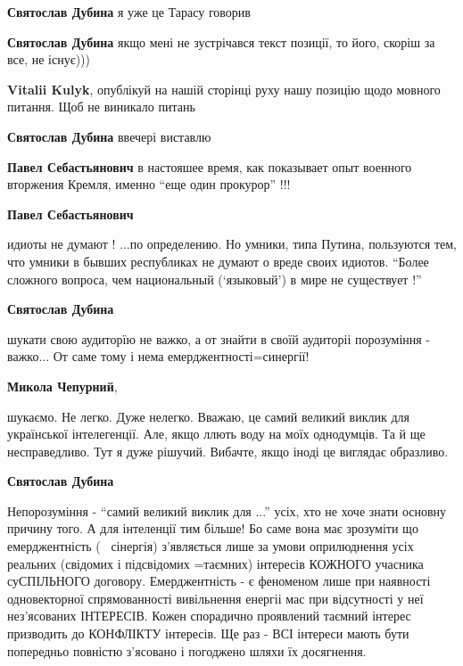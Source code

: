 \begin{itemize}
\begin{itemize}
\textbf{Святослав Дубина} я уже це Тарасу говорив

\textbf{Святослав Дубина} якщо мені не зустрічався текст позиції, то його, скоріш за все, не існує)))

\textbf{Vitalii Kulyk}, опублікуй на нашій сторінці руху нашу позицію щодо мовного питання. Щоб не виникало питань

\textbf{Святослав Дубина} ввечері виставлю

\textbf{Павел Себастьянович} в настояшее время, как показывает опыт военного вторжения Кремля, именно \enquote{еще один прокурор} !!!

\textbf{Павел Себастьянович} 

идиоты не думают ! ...по определению. Но умники, типа Путина, пользуются тем,
что умники в бывших республиках не думают о вреде своих идиотов. \enquote{Более
сложного вопроса, чем национальный (\enquote{языковый}) в мире не существует !}

\textbf{Святослав Дубина} 

шукати свою аудиторїю не важко, а от знайти в своїй аудиторіі порозуміння -
важко... От саме тому і нема емерджентності=синергії!

\textbf{Микола Чепурний}, 

шукаємо. Не легко. Дуже нелегко. Вважаю, це самий великий виклик для
української інтелегенції. Але, якщо ллють воду на моїх однодумців. Та й ще
несправедливо. Тут я дуже рішучий. Вибачте, якщо іноді це виглядає образливо.

\textbf{Святослав Дубина} 

Непорозуміння - \enquote{самий великий виклик для ...} усіх, хто не хоче знати основну
причину того. А для інтеленції тим більше! Бо саме вона має зрозуміти що
емерджентність (~ сінергія) з'являється лише за умови оприлюднення усіх
реальних (свідомих і підсвідомих =таємних) інтересів КОЖНОГО учасника
суСПІЛЬНОГО договору. Емерджентність - є феноменом лише при наявності
одновекторної спрямованності вивільнення енергіі мас при відсутності у неї
нез'ясованих ІНТЕРЕСІВ. Кожен спорадично проявлений таємний інтерес призводить
до КОНФЛІКТУ інтересів. Ще раз - ВСІ інтереси мають бути попередньо повністю
з'ясовано і погоджено шляхи їх досягнення.

\end{itemize} %


\end{itemize}
